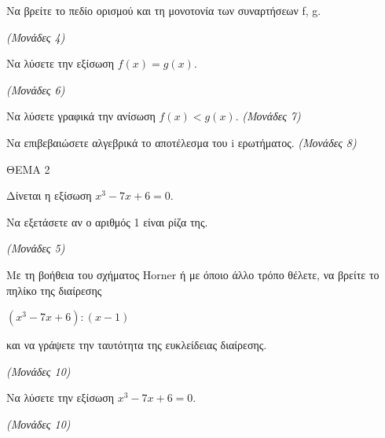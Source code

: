 \documentclass[11pt,a4paper,twoside]{book}
\newcommand{\monades}[1]{\hfill \textit{(Μονάδες #1)}}
\begin{document}
\begin{center}
\end{center}

\begin{alist}
\item Να βρείτε το πεδίο ορισμού και τη μονοτονία των συναρτήσεων f, g.

\monades{4}

\item Να λύσετε την εξίσωση $f(x) = g(x).$

\monades{6}

\item

\begin{rlist}
\item
  Να λύσετε γραφικά την ανίσωση $f(x) < g(x).$ \monades{7}
\item
  Να επιβεβαιώσετε αλγεβρικά το αποτέλεσμα του i ερωτήματος. \monades{8}
\end{rlist}
\end{alist}

\vspace{4mm}

ΘΕΜΑ 2

Δίνεται η εξίσωση $x^3 - 7x + 6 = 0$.

\begin{alist}
\item Να εξετάσετε αν ο αριθμός 1 είναι ρίζα της.

\monades{5}

\item Με τη βοήθεια του σχήματος Horner ή με όποιο άλλο τρόπο θέλετε, να βρείτε το πηλίκο της διαίρεσης

$(x^3 - 7x + 6) : (x - 1)$

και να γράψετε την ταυτότητα της ευκλείδειας διαίρεσης.

\monades{10}

\item Να λύσετε την εξίσωση $x^3 - 7x + 6 = 0$.

\monades{10}
\end{alist}
\end{document}
